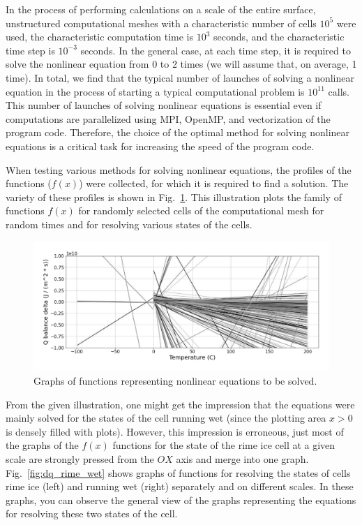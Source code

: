 \documentclass[
11pt,%
tightenlines,%
twoside,%
onecolumn,%
nofloats,%
nobibnotes,%
nofootinbib,%
superscriptaddress,%
noshowpacs,%
centertags]%
{revtex4}
\begin{document}
In the process of performing calculations on a scale of the entire surface, unstructured computational meshes with a characteristic number of cells $10^5 $ were used, the characteristic computation time is $10^3$ seconds, and the characteristic time step is $10^{-3}$ seconds.
In the general case, at each time step, it is required to solve the nonlinear equation from 0 to 2 times (we will assume that, on average, 1 time).
In total, we find that the typical number of launches of solving a nonlinear equation in the process of starting a typical computational problem is $10^11$ calls.
This number of launches of solving nonlinear equations is essential even if computations are parallelized using MPI, OpenMP, and vectorization of the program code.
Therefore, the choice of the optimal method for solving nonlinear equations is a critical task for increasing the speed of the program code.

When testing various methods for solving nonlinear equations, the profiles of the functions ($f(x)$) were collected, for which it is required to find a solution.
The variety of these profiles is shown in Fig.~\ref{fig:dq}.
This illustration plots the family of functions $f(x)$ for randomly selected cells of the computational mesh for random times and for resolving various states of the cells.

\begin{figure}[h]
\setcaptionmargin{5mm}
\onelinecaptionstrue
\includegraphics[width=1.0\textwidth]{pics/dq.pdf}
\caption{Graphs of functions representing nonlinear equations to be solved.}\label{fig:dq}
\end{figure}

From the given illustration, one might get the impression that the equations were mainly solved for the states of the cell running wet (since the plotting area $x > 0$ is densely filled with plots).
However, this impression is erroneous, just most of the graphs of the $f(x)$ functions for the state of the rime ice cell at a given scale are strongly pressed from the $OX$ axis and merge into one graph.
Fig.~\ref{fig:dq_rime_wet} shows graphs of functions for resolving the states of cells rime ice (left) and running wet (right) separately and on different scales.
In these graphs, you can observe the general view of the graphs representing the equations for resolving these two states of the cell.
\end{document}
